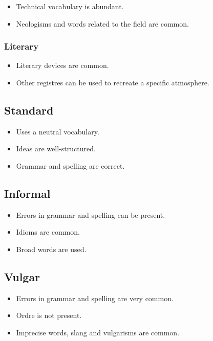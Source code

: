 \documentclass{article}
\begin{document}
\begin{itemize}
    \item Technical vocabulary is abundant.
    \item Neologisms and words related to the field are common.
\end{itemize}

\subsubsection*{Literary}

\begin{itemize}
    \item Literary devices are common.
    \item Other registres can be used to recreate a specific atmosphere.
\end{itemize}

\subsection*{Standard}

\begin{itemize}
    \item Uses a neutral vocabulary.
    \item Ideas are well-structured.
    \item Grammar and spelling are correct.
\end{itemize}

\subsection*{Informal}

\begin{itemize}
    \item Errors in grammar and spelling can be present.
    \item Idioms are common.
    \item Broad words are used.
\end{itemize}

\subsection*{Vulgar}

\begin{itemize}
    \item Errors in grammar and spelling are very common.
    \item Ordre is not present.
    \item Imprecise words, slang and vulgarisms are common.
\end{itemize}
\end{document}
